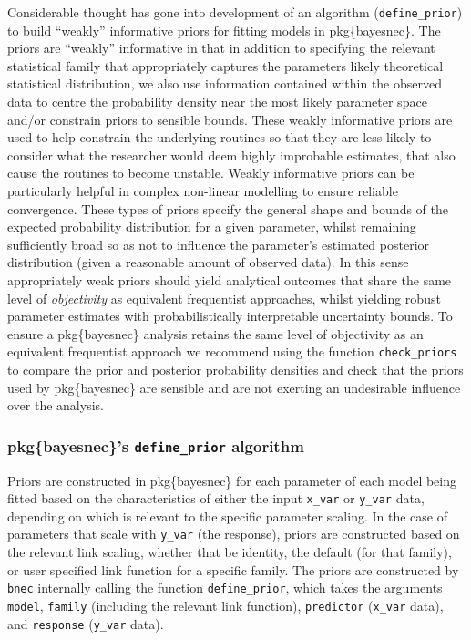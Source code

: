 \documentclass[
]{jss}
\begin{document}
Considerable thought has gone into development of an algorithm
(\texttt{define\_prior}) to build ``weakly'' informative priors for
fitting models in pkg\{bayesnec\}. The priors are ``weakly'' informative
in that in addition to specifying the relevant statistical family that
appropriately captures the parameters likely theoretical statistical
distribution, we also use information contained within the observed data
to centre the probability density near the most likely parameter space
and/or constrain priors to sensible bounds. These weakly informative
priors are used to help constrain the underlying routines so that they
are less likely to consider what the researcher would deem highly
improbable estimates, that also cause the routines to become unstable.
Weakly informative priors can be particularly helpful in complex
non-linear modelling to ensure reliable convergence. These types of
priors specify the general shape and bounds of the expected probability
distribution for a given parameter, whilst remaining sufficiently broad
so as not to influence the parameter's estimated posterior distribution
(given a reasonable amount of observed data). In this sense
appropriately weak priors should yield analytical outcomes that share
the same level of \emph{objectivity} as equivalent frequentist
approaches, whilst yielding robust parameter estimates with
probabilistically interpretable uncertainty bounds. To ensure a
pkg\{bayesnec\} analysis retains the same level of objectivity as an
equivalent frequentist approach we recommend using the function
\texttt{check\_priors} to compare the prior and posterior probability
densities and check that the priors used by pkg\{bayesnec\} are sensible
and are not exerting an undesirable influence over the analysis.

\hypertarget{pkgbayesnecs-define_prior-algorithm}{%
\subsubsection{\texorpdfstring{pkg\{bayesnec\}'s \texttt{define\_prior}
algorithm}{pkg\{bayesnec\}'s define\_prior algorithm}}\label{pkgbayesnecs-define_prior-algorithm}}

Priors are constructed in pkg\{bayesnec\} for each parameter of each
model being fitted based on the characteristics of either the input
\texttt{x\_var} or \texttt{y\_var} data, depending on which is relevant
to the specific parameter scaling. In the case of parameters that scale
with \texttt{y\_var} (the response), priors are constructed based on the
relevant link scaling, whether that be identity, the default (for that
family), or user specified link function for a specific family. The
priors are constructed by \texttt{bnec} internally calling the function
\texttt{define\_prior}, which takes the arguments \texttt{model},
\texttt{family} (including the relevant link function),
\texttt{predictor} (\texttt{x\_var} data), and \texttt{response}
(\texttt{y\_var} data).
\end{document}
